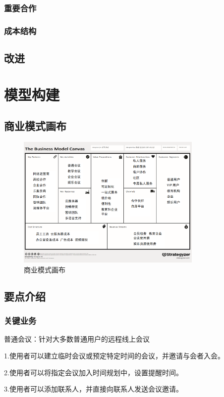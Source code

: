 \documentclass[a4paper,12pt]{article}
\begin{document}
\subsubsection{重要合作}
\subsubsection{成本结构}
\subsection{改进}
\section{模型构建}
\subsection{商业模式画布}
\begin{figure}[h]
    \centering
    \includegraphics[width=0.8\textwidth]{商业模式画布.png}
    \caption{商业模式画布}
\end{figure}
\clearpage
\subsection{要点介绍}
\subsubsection{关键业务}
\noindent 普通会议：针对大多数普通用户的远程线上会议

1.使用者可以建立临时会议或预定特定时间的会议，并邀请与会者入会。

2.使用者可以将指定会议加入时间规划中，设置提醒时间。

3.使用者可以添加联系人，并直接向联系人发送会议邀请。
\end{document}

